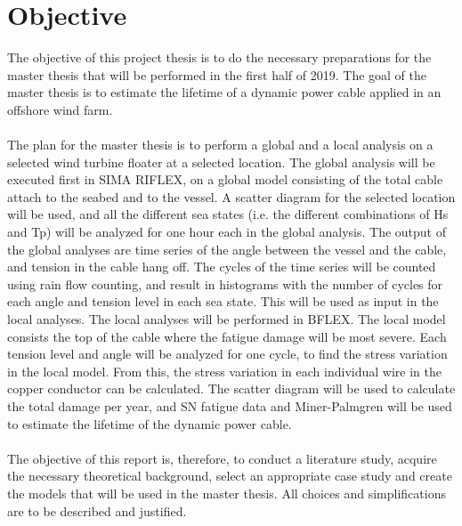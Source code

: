 \section{Objective}
The objective of this project thesis is to do the necessary preparations for the master thesis that will be performed in the first half of 2019. The goal of the master thesis is to estimate the lifetime of a dynamic power cable applied in an offshore wind farm.\\\\ The plan for the master thesis is to perform a global and a local analysis on a selected wind turbine floater at a selected location. The global analysis will be executed first in SIMA RIFLEX, on a global model consisting of the total cable attach to the seabed and to the vessel. A scatter diagram for the selected location will be used, and all the different sea states (i.e. the different combinations of Hs and Tp) will be analyzed for one hour each in the global analysis. The output of the global analyses are time series of the angle between the vessel and the cable, and tension in the cable hang off. The cycles of the time series will be counted using rain flow counting, and result in histograms with the number of cycles for each angle and tension level in each sea state. This will be used as input in the local analyses. The local analyses will be performed in BFLEX. The local model consists the top of the cable where the fatigue damage will be most severe. Each tension level and angle will be analyzed for one cycle, to find the stress variation in the local model. From this, the stress variation in each individual wire in the copper conductor can be calculated. The scatter diagram will be used to calculate the total damage per year, and SN fatigue data and Miner-Palmgren will be used to estimate the lifetime of the dynamic power cable. \\\\ The objective of this report is, therefore, to conduct a literature study, acquire the necessary theoretical background, select an appropriate case study and create the models that will be used in the master thesis. All choices and simplifications are to be described and justified. 

